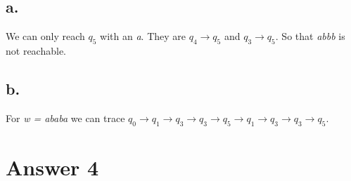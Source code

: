 \documentclass[12pt]{article}
\begin{document}
\subsection*{a.}
We can only reach \( q_5 \) with an \textit{a}. They are \( q_4 \rightarrow q_5 \) and \( q_3 \rightarrow q_5 \). So that \textit{abbb} is not reachable.

\subsection*{b.}
For \textit{w = ababa} we can trace \( q_0 \rightarrow q_1 \rightarrow q_3 \rightarrow q_3 \rightarrow q_5 \rightarrow q_1 \rightarrow q_3 \rightarrow q_3 \rightarrow q_5\).\\




\section*{Answer 4}
\end{document}
